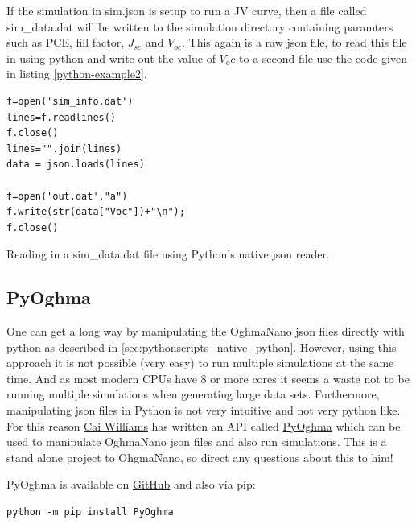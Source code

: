 If the simulation in sim.json is setup to run a JV curve, then a file called sim\_data.dat will be written to the simulation directory containing paramters such as PCE, fill factor, $J_{sc}$ and $V_{oc}$.  This again is a raw json file, to read this file in using python and write out the value of $V_oc$ to a second file use the code given in listing \ref{python-example2}.

\begin{listing}[H]
\begin{verbatim}
f=open('sim_info.dat')
lines=f.readlines()
f.close()
lines="".join(lines)
data = json.loads(lines)

f=open('out.dat',"a")
f.write(str(data["Voc"])+"\n");
f.close()

\end{verbatim}
\caption{Reading in a sim\_data.dat file using Python's native json reader.} 
\label{python-example2}
\end{listing}


\subsection{PyOghma}
One can get a long way by manipulating the OghmaNano json files directly with python as described in \ref{sec:pythonscripts_native_python}. However, using this approach it is not possible (very easy) to run multiple simulations at the same time. And as most modern CPUs have 8 or more cores it seems a waste not to be running multiple simulations when generating large data sets. Furthermore, manipulating json files in Python is not very intuitive and not very python like. For this reason \href{https://github.com/CaiWilliams}{Cai Williams} has written an API called \href{https://github.com/CaiWilliams/PyOghma/tree/master}{PyOghma} which can be used to manipulate OghmaNano json files and also run simulations. This is a stand alone project to OhgmaNano, so direct any questions about this to him!

PyOghma is available on \href{https://github.com/CaiWilliams/PyOghma/tree/master}{GitHub} and also via pip:

\begin{listing}[H]
\begin{verbatim}
python -m pip install PyOghma
\end{verbatim}
\end{listing}

